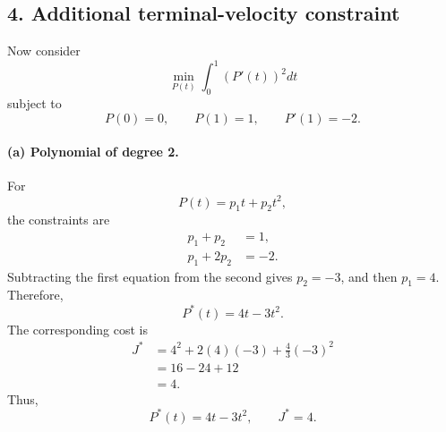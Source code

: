 \documentclass[11pt]{article}
\begin{document}
\subsection*{4. Additional terminal-velocity constraint}

Now consider
\begin{equation}
    \min_{P(t)} \int_0^1 \left(P'(t)\right)^2dt
\end{equation}
subject to
\begin{equation}
    P(0)=0, \qquad P(1)=1, \qquad P'(1)=-2.
\end{equation}

\paragraph{(a) Polynomial of degree 2.}
For
\begin{equation}
    P(t)=p_1t+p_2t^2,
\end{equation}
the constraints are
\begin{align}
    p_1+p_2&=1, \\
    p_1+2p_2&=-2.
\end{align}
Subtracting the first equation from the second gives $p_2=-3$, and
then $p_1=4$. Therefore,
\begin{equation}
    P^*(t)=4t-3t^2.
\end{equation}
The corresponding cost is
\begin{align}
    J^*
    &=4^2+2(4)(-3)+\frac{4}{3}(-3)^2 \\
    &=16-24+12 \\
    &=4.
\end{align}
Thus,
\begin{equation}
    \boxed{P^*(t)=4t-3t^2, \qquad J^*=4.}
\end{equation}
\end{document}
